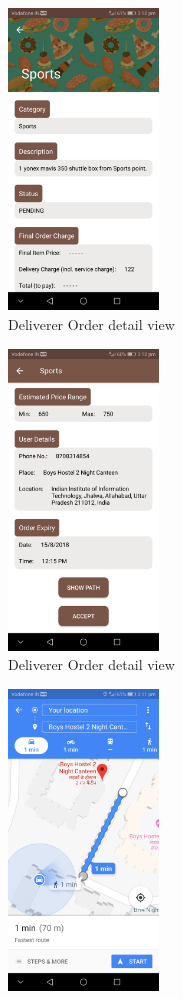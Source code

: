 \documentclass{report}
\begin{document}
\begin{figure}[h!]
\begin{subfigure}[h!]{.24\textwidth}
\centering
\includegraphics[width=4cm]{deliverer_order_detail1.jpg}
\caption{\centering Deliverer Order detail view}
\end{subfigure}
\begin{subfigure}[h!]{.24\textwidth}
\centering
\includegraphics[width=4cm]{deliverer_order_detail2.jpg}
\caption{\centering Deliverer Order detail view}
\end{subfigure}
\begin{subfigure}[h!]{.24\textwidth}
\centering
\includegraphics[width=4cm]{show_path.jpg}

\end{subfigure}
\end{figure}
\end{document}
